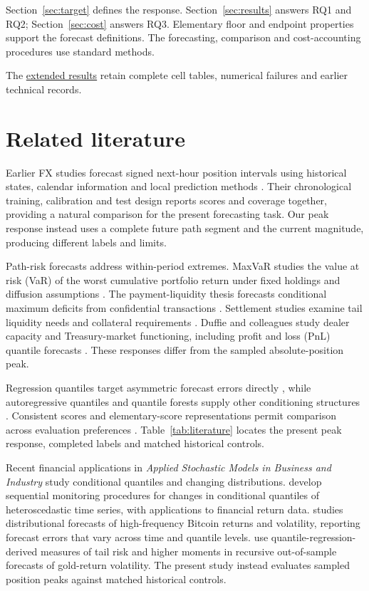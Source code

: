 \documentclass[11pt,a4paper]{article}
\begin{document}
Section~\ref{sec:target} defines the response. Section~\ref{sec:results} answers RQ1 and RQ2; Section~\ref{sec:cost} answers RQ3. Elementary floor and endpoint properties support the forecast definitions. The forecasting, comparison and cost-accounting procedures use standard methods.

\FloatBarrier

The \href{https://github.com/ByronLi0207/financial-mathematics-paper-20261020/blob/submission-final/EXTENDED_RESULTS.md}{extended results} retain complete cell tables, numerical failures and earlier technical records.

\section{Related literature}\label{sec:literature}

Earlier FX studies forecast signed next-hour position intervals using historical states, calendar information and local prediction methods \citep{wisniewski2020,wisniewski2024}. Their chronological training, calibration and test design reports scores and coverage together, providing a natural comparison for the present forecasting task. Our peak response instead uses a complete future path segment and the current magnitude, producing different labels and limits.


Path-risk forecasts address within-period extremes. MaxVaR studies the value at risk (VaR) of the worst cumulative portfolio return under fixed holdings and diffusion assumptions \citep{boudoukh2004}. The payment-liquidity thesis forecasts conditional maximum deficits from confidential transactions \citep{hoogen2017}. Settlement studies examine tail liquidity needs and collateral requirements \citep{petrunia2019,arjani2020}. Duffie and colleagues study dealer capacity and Treasury-market functioning, including profit and loss (PnL) quantile forecasts \citep{duffie2023}. These responses differ from the sampled absolute-position peak.


Regression quantiles target asymmetric forecast errors directly \citep{koenker1978}, while autoregressive quantiles and quantile forests supply other conditioning structures \citep{engle2004,meinshausen2006}. Consistent scores and elementary-score representations permit comparison across evaluation preferences \citep{gneiting2011,ehm2016}. Table~\ref{tab:literature} locates the present peak response, completed labels and matched historical controls.


Recent financial applications in \emph{Applied Stochastic Models in Business and Industry} study conditional quantiles and changing distributions. \citet{LeeKim2024ASMBI} develop sequential monitoring procedures for changes in conditional quantiles of heteroscedastic time series, with applications to financial return data. \citet{Pagnottoni2026ASMBI} studies distributional forecasts of high-frequency Bitcoin returns and volatility, reporting forecast errors that vary across time and quantile levels. \citet{MuddanaEtAl2025ASMBI} use quantile-regression-derived measures of tail risk and higher moments in recursive out-of-sample forecasts of gold-return volatility. The present study instead evaluates sampled position peaks against matched historical controls.
\end{document}
